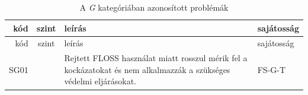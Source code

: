 \documentclass[12pt,magyar,a4paper,oneside]{scrreprt}
\begin{document}
\begin{longtable}[]{@{}rcll@{}}
\caption{A \emph{G} kategóriában azonosított problémák}\tabularnewline
\toprule
\begin{minipage}[b]{0.03\columnwidth}\raggedleft
kód\strut
\end{minipage} & \begin{minipage}[b]{0.03\columnwidth}\centering
szint\strut
\end{minipage} & \begin{minipage}[b]{0.69\columnwidth}\raggedright
leírás\strut
\end{minipage} & \begin{minipage}[b]{0.13\columnwidth}\raggedright
sajátosság\strut
\end{minipage}\tabularnewline
\midrule
\endfirsthead
\toprule
\begin{minipage}[b]{0.03\columnwidth}\raggedleft
kód\strut
\end{minipage} & \begin{minipage}[b]{0.03\columnwidth}\centering
szint\strut
\end{minipage} & \begin{minipage}[b]{0.69\columnwidth}\raggedright
leírás\strut
\end{minipage} & \begin{minipage}[b]{0.13\columnwidth}\raggedright
sajátosság\strut
\end{minipage}\tabularnewline
\midrule
\endhead
\begin{minipage}[t]{0.03\columnwidth}\raggedleft
SG01\strut
\end{minipage} & \begin{minipage}[t]{0.03\columnwidth}\centering
1\strut
\end{minipage} & \begin{minipage}[t]{0.69\columnwidth}\raggedright
Rejtett FLOSS használat miatt rosszul mérik fel a kockázatokat és nem
alkalmazzák a szükséges védelmi eljárásokat.\strut
\end{minipage} & \begin{minipage}[t]{0.13\columnwidth}\raggedright
FS-G-T\strut
\end{minipage}\tabularnewline
\bottomrule
\end{longtable}
\end{document}
